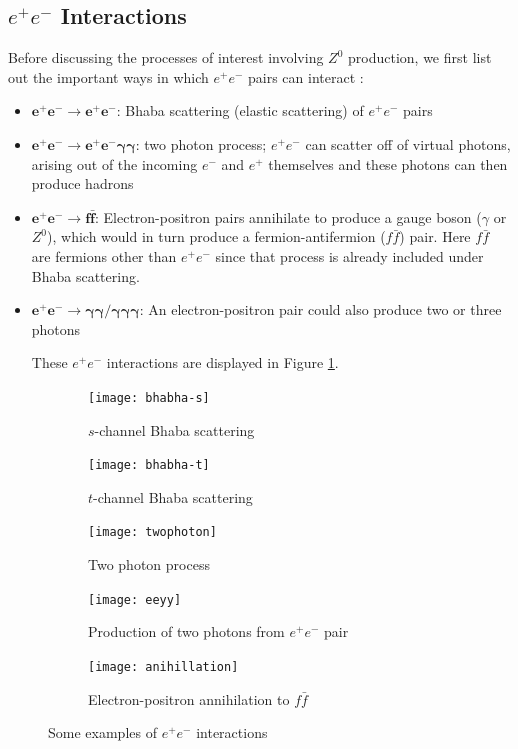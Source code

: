 \subsection{$e^{+}e^{-}$ Interactions}
Before discussing the processes of interest involving $Z^{0}$ production, we first list out the important ways in which $e^{+}e^{-}$ pairs can interact \cite{UB}:
\begin{itemize}
\item $\bm{e^{+}e^{-}\rightarrow e^{+}e^{-}}$: Bhaba scattering (elastic scattering) of $e^{+}e^{-}$ pairs 
\item $\bm{e^{+}e^{-}\rightarrow e^{+}e^{-}\gamma \gamma}$: two photon process; $e^{+}e^{-}$ can scatter off of virtual photons, arising out of the incoming $e^{-}$ and $e^{+}$ themselves and these photons can then produce hadrons
\item $\bm{e^{+}e^{-}\rightarrow f \bar{f}}$: Electron-positron pairs annihilate to produce a gauge boson ($\gamma$ or $Z^{0}$), which would in turn produce a fermion-antifermion ($f\bar{f}$) pair. Here $f\bar{f}$ are fermions other than $e^{+}e^{-}$ since that process is already included under Bhaba scattering.
\item $\bm{e^{+}e^{-}\rightarrow \gamma \gamma / \gamma \gamma \gamma}$: An electron-positron pair could also produce two or three photons 

These $e^{+}e^{-}$ interactions are displayed in Figure \ref{fig:eeint}.

\end{itemize}

\begin{figure}[H]
\centering
\begin{subfigure}{0.4\textwidth}
    \texttt{[image: bhabha-s]}
    \caption{$s$-channel Bhaba scattering}
\end{subfigure}
\begin{subfigure}{0.4\textwidth}
    \texttt{[image: bhabha-t]}
    \caption{$t$-channel Bhaba scattering}
\end{subfigure}
\begin{subfigure}{0.4\textwidth}
\centering
    \texttt{[image: twophoton]}
    \caption{Two photon process}
\end{subfigure}
\begin{subfigure}{0.4\textwidth}
\centering
    \texttt{[image: eeyy]}
    \vspace{2em}
    \caption{Production of two photons from $e^{+}e^{-}$ pair}
\end{subfigure}
\begin{subfigure}{0.45\textwidth}
    \texttt{[image: anihillation]}
    \caption{Electron-positron annihilation to $f\bar{f}$}
\end{subfigure}
\caption{Some examples of $e^{+}e^{-}$ interactions \cite{UB,Janot:2705419,qmdiaries}}
\label{fig:eeint}
\end{figure}

